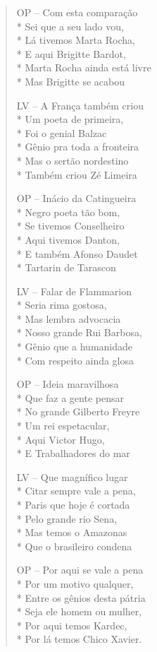\begin{verse}
OP -- Com esta comparação\\*
Sei que a seu lado vou,\\*
Lá tivemos Marta Rocha,\\*
E aqui Brigitte Bardot,\\*
Marta Rocha ainda está livre\\*
Mas Brigitte se acabou

LV -- A França também criou\\*
Um poeta de primeira,\\*
Foi o genial Balzac\\*
Gênio pra toda a fronteira\\*
Mas o sertão nordestino\\*
Também criou Zé Limeira

OP -- Inácio da Catingueira\\*
Negro poeta tão bom,\\*
Se tivemos Conselheiro\\*
Aqui tivemos Danton,\\*
E também Afonso Daudet\\*
Tartarin de Tarascon

LV -- Falar de Flammarion\\*
Seria rima gostosa,\\*
Mas lembra advocacia\\*
Nosso grande Rui Barbosa,\\*
Gênio que a humanidade\\*
Com respeito ainda glosa

OP -- Ideia maravilhosa\\*
Que faz a gente pensar\\*
No grande Gilberto Freyre\\*
Um rei espetacular,\\*
Aqui Victor Hugo,\\*
E Trabalhadores do mar

LV -- Que magnífico lugar\\*
Citar sempre vale a pena,\\*
Paris que hoje é cortada\\*
Pelo grande rio Sena,\\*
Mas temos o Amazonas\\*
Que o brasileiro condena

OP -- Por aqui se vale a pena\\*
Por um motivo qualquer,\\*
Entre os gênios desta pátria\\*
Seja ele homem ou mulher,\\*
Por aqui temos Kardec,\\*
Por lá temos Chico Xavier.
\end{verse}


